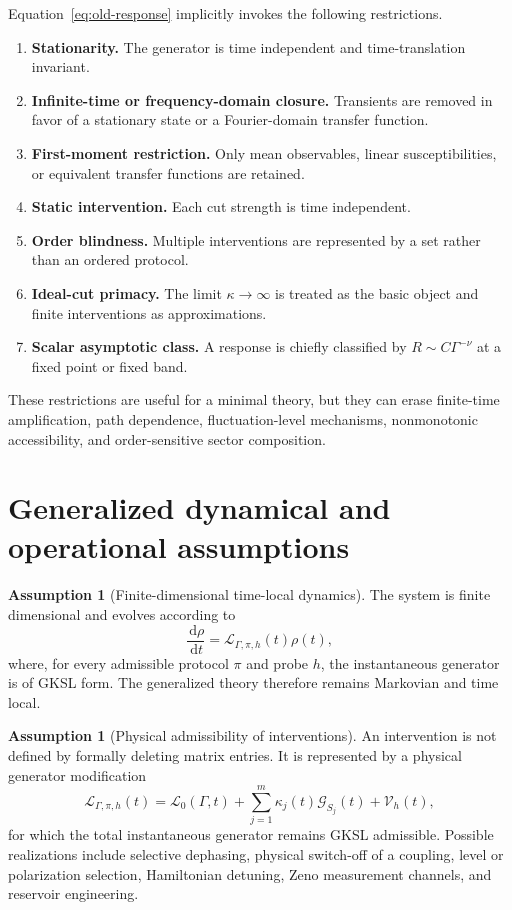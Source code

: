 \documentclass[11pt]{article}
\theoremstyle{definition}
\newtheorem{assumption}[theorem]{Assumption}
\theoremstyle{remark}
\newcommand{\dd}{\,\mathrm d}
\newcommand{\cL}{\mathcal L}
\newcommand{\cG}{\mathcal G}
\newcommand{\cV}{\mathcal V}
\begin{document}
Equation~\eqref{eq:old-response} implicitly invokes the following restrictions.
\begin{enumerate}[label=\textbf{O\arabic*.}]
  \item \textbf{Stationarity.} The generator is time independent and time-translation invariant.
  \item \textbf{Infinite-time or frequency-domain closure.} Transients are removed in favor of a stationary state or a Fourier-domain transfer function.
  \item \textbf{First-moment restriction.} Only mean observables, linear susceptibilities, or equivalent transfer functions are retained.
  \item \textbf{Static intervention.} Each cut strength is time independent.
  \item \textbf{Order blindness.} Multiple interventions are represented by a set rather than an ordered protocol.
  \item \textbf{Ideal-cut primacy.} The limit $\kappa\to\infty$ is treated as the basic object and finite interventions as approximations.
  \item \textbf{Scalar asymptotic class.} A response is chiefly classified by $R\sim C\Gamma^{-\nu}$ at a fixed point or fixed band.
\end{enumerate}
These restrictions are useful for a minimal theory, but they can erase finite-time amplification, path dependence, fluctuation-level mechanisms, nonmonotonic accessibility, and order-sensitive sector composition.

\section{Generalized dynamical and operational assumptions}

\begin{assumption}[Finite-dimensional time-local dynamics]\label{ass:gksl}
The system is finite dimensional and evolves according to
\begin{equation}
\frac{\dd\rho}{\dd t}
 = \cL_{\Gamma,\pi,h}(t)\rho(t),
\label{eq:gksl-master}
\end{equation}
where, for every admissible protocol $\pi$ and probe $h$, the instantaneous generator is of GKSL form. The generalized theory therefore remains Markovian and time local.
\end{assumption}

\begin{assumption}[Physical admissibility of interventions]\label{ass:physical-cut}
An intervention is not defined by formally deleting matrix entries. It is represented by a physical generator modification
\begin{equation}
\cL_{\Gamma,\pi,h}(t)
 = \cL_0(\Gamma,t)
 + \sum_{j=1}^{m}\kappa_j(t)\cG_{S_j}(t)
 + \cV_h(t),
\label{eq:protocol-generator}
\end{equation}
for which the total instantaneous generator remains GKSL admissible. Possible realizations include selective dephasing, physical switch-off of a coupling, level or polarization selection, Hamiltonian detuning, Zeno measurement channels, and reservoir engineering.
\end{assumption}
\end{document}
